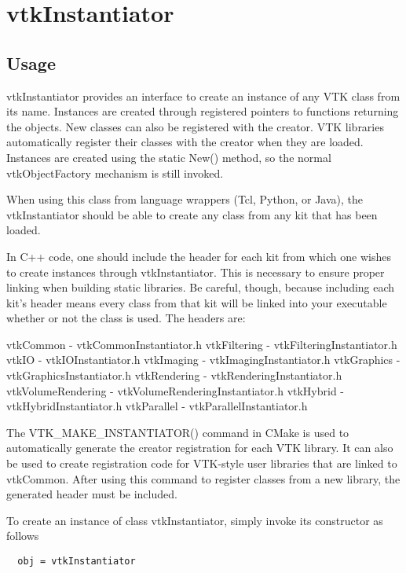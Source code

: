 \section{vtkInstantiator}

\subsection{Usage}

 vtkInstantiator provides an interface to create an instance of any
 VTK class from its name.  Instances are created through registered
 pointers to functions returning the objects.  New classes can also be
 registered with the creator.  VTK libraries automatically register
 their classes with the creator when they are loaded.  Instances are
 created using the static New() method, so the normal vtkObjectFactory
 mechanism is still invoked.

 When using this class from language wrappers (Tcl, Python, or Java),
 the vtkInstantiator should be able to create any class from any kit
 that has been loaded.

 In C++ code, one should include the header for each kit from which
 one wishes to create instances through vtkInstantiator.  This is
 necessary to ensure proper linking when building static libraries.
 Be careful, though, because including each kit's header means every
 class from that kit will be linked into your executable whether or
 not the class is used.  The headers are:

   vtkCommon          - vtkCommonInstantiator.h
   vtkFiltering       - vtkFilteringInstantiator.h
   vtkIO              - vtkIOInstantiator.h
   vtkImaging         - vtkImagingInstantiator.h
   vtkGraphics        - vtkGraphicsInstantiator.h
   vtkRendering       - vtkRenderingInstantiator.h
   vtkVolumeRendering - vtkVolumeRenderingInstantiator.h
   vtkHybrid          - vtkHybridInstantiator.h
   vtkParallel        - vtkParallelInstantiator.h

 The VTK\_MAKE\_INSTANTIATOR() command in CMake is used to automatically
 generate the creator registration for each VTK library.  It can also
 be used to create registration code for VTK-style user libraries
 that are linked to vtkCommon.  After using this command to register
 classes from a new library, the generated header must be included.


To create an instance of class vtkInstantiator, simply
invoke its constructor as follows
\begin{verbatim}
  obj = vtkInstantiator
\end{verbatim}
